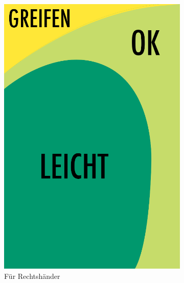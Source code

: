 \begin{figure}
	\centering
	\begin{subfigure}[b]{0.3\textwidth}
		\centering
			\includegraphics[width=1\textwidth]{img/anordungDerElementeSimple.png}
			\caption{Für Rechtshänder\linebreak}\label{fig:rechtsPositioning}
	\end{subfigure}
	\begin{subfigure}[b]{0.3\textwidth}
		\centering

\end{subfigure}
\end{figure}
